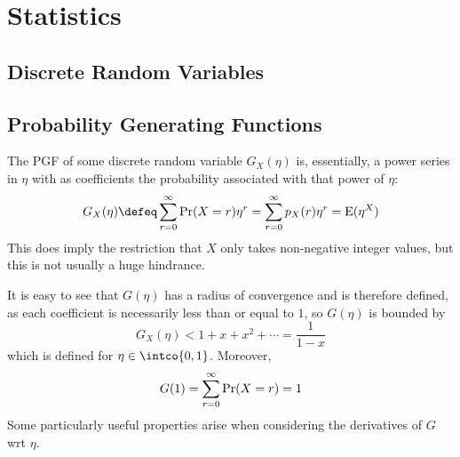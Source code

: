 \section{Statistics}

\subsection{Discrete Random Variables}

\subsection{Probability Generating Functions}

The PGF of some discrete random variable \(G_X(\eta)\) is, essentially, a power
series in \(\eta\) with as coefficients the probability associated with that
power of \(\eta\):
\begin{equation*}
G_X(\eta) \defeq \sum_{r = 0}^\infty \Prob(X = r)\eta^r
    = \sum_{r = 0}^\infty p_X(r)\eta^r
    = \Expect(\eta^X)
\end{equation*}
This does imply the restriction that \(X\) only takes
non-negative integer values, but this is not usually a huge hindrance.

It is easy to see that \(G(\eta)\) has a radius of convergence and is therefore
defined, as each coefficient is necessarily less than or equal to \(1\), so
\(G(\eta)\) is bounded by
\begin{equation*}
G_X(\eta) < 1 + x + x^2 + \dotsb = \frac 1{1 - x}
\end{equation*}
which is defined for \(\eta \in \intco{0, 1}\). Moreover,
\begin{equation*}
G(1) = \sum_{r = 0}^\infty \operatorname{Pr}(X = r) = 1
\end{equation*}
Some particularly useful properties arise when considering the derivatives of
\(G\) wrt \(\eta\).

